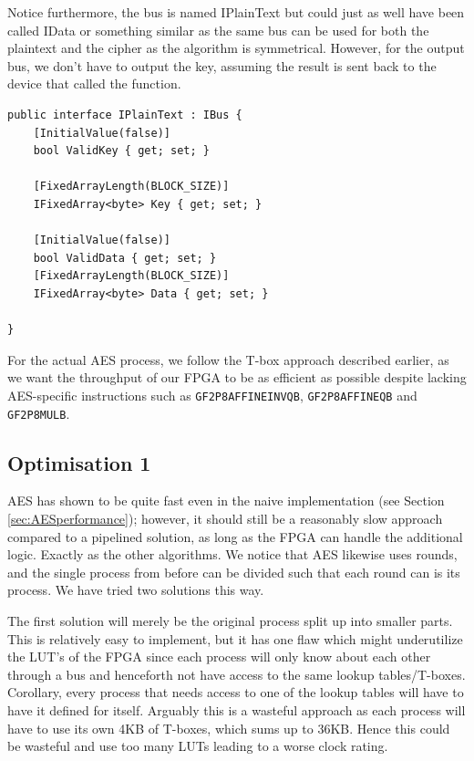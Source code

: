 \documentclass[a4paper, openany]{book}
\begin{document}
\begin{abstact}
Notice furthermore, the bus is named IPlainText but could just as well have been called IData or something similar as the same bus can be used for both the plaintext and the cipher as the algorithm is symmetrical. However, for the output bus, we don't have to output the key, assuming the result is sent back to the device that called the function.

\begin{verbatim}
public interface IPlainText : IBus {
    [InitialValue(false)]
    bool ValidKey { get; set; }

    [FixedArrayLength(BLOCK_SIZE)]
    IFixedArray<byte> Key { get; set; }

    [InitialValue(false)]
    bool ValidData { get; set; }
    [FixedArrayLength(BLOCK_SIZE)]
    IFixedArray<byte> Data { get; set; }

}
\end{verbatim}
For the actual AES process, we follow the T-box approach described earlier, as we want the throughput of our FPGA to be as efficient as possible despite lacking AES-specific instructions such as \texttt{GF2P8AFFINEINVQB}, \texttt{GF2P8AFFINEQB} and \texttt{GF2P8MULB}.
\subsection{Optimisation 1}
\label{AESopt}
AES has shown to be quite fast even in the naive implementation (see Section \ref{sec:AESperformance}); however, it should still be a reasonably slow approach compared to a pipelined solution, as long as the FPGA can handle the additional logic. Exactly as the other algorithms. We notice that AES likewise uses rounds, and the single process from before can be divided such that each round can is its process. We have tried two solutions this way.

The first solution will merely be the original process split up into smaller parts. This is relatively easy to implement, but it has one flaw which might underutilize the LUT's of the FPGA since each process will only know about each other through a bus and henceforth not have access to the same lookup tables/T-boxes. Corollary, every process that needs access to one of the lookup tables will have to have it defined for itself. Arguably this is a wasteful approach as each process will have to use its own 4KB of T-boxes, which sums up to 36KB. Hence this could be wasteful and use too many LUTs leading to a worse clock rating.


\end{abstact}
\end{document}
